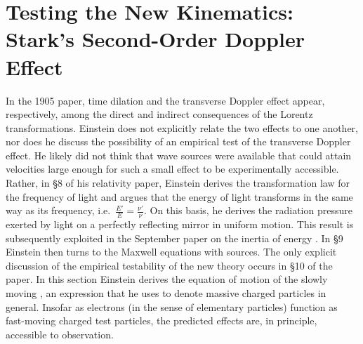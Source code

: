 \documentclass[submitted,12pt]{article} %
\providecommand{\DIFaddbegin}{} %
\providecommand{\DIFaddend}{} %
\providecommand{\DIFdelbegin}{} %
\providecommand{\DIFdelend}{} %
\begin{document}
\DIFdelbegin %
\DIFdelend \DIFaddbegin \section{Testing the New Kinematics: Stark’s Second-Order Doppler Effect}
\DIFaddend 



In the 1905 paper, time dilation and the transverse Doppler effect appear, respectively, among the direct and indirect consequences of the Lorentz transformations. Einstein does not explicitly relate the two effects to one another, nor does he discuss the possibility of an empirical test of the transverse Doppler effect. He likely did not think that wave sources were available that could attain velocities large enough for such a small effect to be experimentally accessible. Rather, in \S8 of his relativity paper, Einstein derives the transformation law for the frequency of light and argues that the energy of light transforms in the same way as its frequency, i.e.\ $\frac{E'}{E}=\frac{\nu'}{\nu}$. On this basis, he derives the radiation pressure exerted by light on a perfectly reflecting mirror in uniform motion. This result is subsequently exploited in the September paper on the inertia of energy \citep{Einstein1905b}. In \S9 Einstein then turns to the Maxwell equations with sources. The only explicit discussion of the empirical testability of the new theory occurs in \S10 of the paper. In this section Einstein derives the equation of motion of the slowly moving , an expression that he uses to denote massive charged particles in general. Insofar as electrons (in the sense of elementary particles) function as fast-moving charged test particles, the predicted effects are, in principle, accessible to observation.
\end{document}
